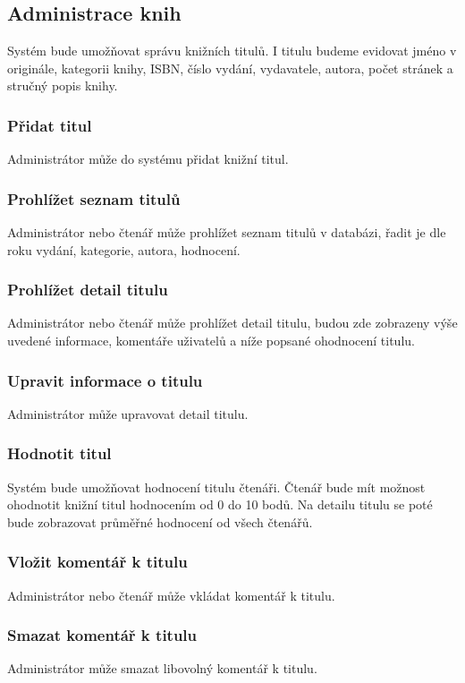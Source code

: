 \documentclass{article}
\begin{document}
\subsection{Administrace knih}
Systém bude umožňovat správu knižních titulů. I titulu budeme evidovat jméno v
originále, kategorii knihy, ISBN, číslo vydání, vydavatele, autora, počet
stránek a stručný popis knihy.

\subsubsection{Přidat titul}
Administrátor může do systému přidat knižní titul.

\subsubsection{Prohlížet seznam titulů}
Administrátor nebo čtenář může prohlížet seznam titulů v databázi, řadit je dle
roku vydání, kategorie, autora, hodnocení.

\subsubsection{Prohlížet detail titulu}
Administrátor nebo čtenář může prohlížet detail titulu, budou zde zobrazeny výše
uvedené informace, komentáře uživatelů a níže popsané ohodnocení titulu.

\subsubsection{Upravit informace o titulu}
Administrátor může upravovat detail titulu.


\subsubsection{Hodnotit titul}
Systém bude umožňovat hodnocení titulu čtenáři. Čtenář bude mít možnost
ohodnotit knižní titul hodnocením od 0 do 10 bodů. Na detailu titulu se poté
bude zobrazovat průměřné hodnocení od všech čtenářů.

\subsubsection{Vložit komentář k titulu}
Administrátor nebo čtenář může vkládat komentář k titulu.

\subsubsection{Smazat komentář k titulu}
Administrátor může smazat libovolný komentář k titulu.
\end{document}
